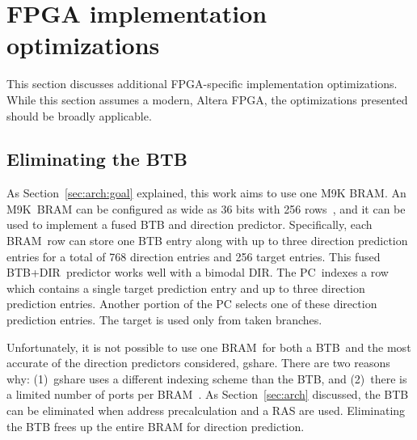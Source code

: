 \section{FPGA implementation optimizations}
\label{sec:fpga}

This section discusses additional FPGA-specific implementation optimizations. 
While this section assumes a modern, Altera FPGA, the optimizations presented should be broadly applicable.

\subsection{Eliminating the BTB}
\label{sec:fpga:nobtb}
As Section~\ref{sec:arch:goal} explained, this work aims to use one M9K BRAM. An M9K\ BRAM can be configured as wide as 36 bits with 256 rows~\cite{StratixIVM9K}, and it can be used to implement a fused BTB and direction predictor. Specifically, each BRAM\ row can store one BTB entry along with up to three direction prediction entries for a total of 768 direction entries and 256 target entries. This fused BTB+DIR\ predictor works well with  a bimodal DIR. The PC\ indexes a row which contains a single target prediction entry and up  to three direction prediction entries. Another portion of the PC selects one of these direction prediction entries. The target is used only from taken branches. 

Unfortunately, it is not possible to use one BRAM\ for both a BTB\ and the most accurate of the direction predictors considered, gshare. There are two reasons why: (1)~gshare uses a different indexing scheme than the BTB, and (2)~there is a limited number of ports per BRAM~\cite{StratixIVM9K}. As Section~\ref{sec:arch} discussed, the BTB can be eliminated when address precalculation and a RAS are used. Eliminating the BTB frees up the entire BRAM for direction prediction. 

